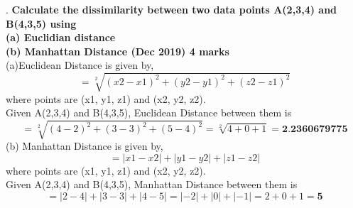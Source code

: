 .
\textbf{\textcolor{LightMagenta}{Calculate the dissimilarity between two data points A(2,3,4) and B(4,3,5) using\\ 
(a) Euclidian distance\\ (b) Manhattan Distance  (Dec 2019) \hfill 4 marks}} \\[5pt]
(a)Euclidean Distance is given by,\[=\sqrt[2]{(x2-x1)^2+(y2-y1)^2+(z2-z1)^2}\] 
where points are (x1, y1, z1) and (x2, y2, z2).\\
Given A(2,3,4) and B(4,3,5), Euclidean Distance between them is \[=\sqrt[2]{(4-2)^2+(3-3)^2+(5-4)^2} = \sqrt[2]{4+0+1}= \textbf{2.2360679775}\]
(b) Manhattan Distance is given by, \[=|x1 - x2| + |y1 - y2| + |z1 - z2|\]
where points are (x1, y1, z1) and (x2, y2, z2).\\
Given A(2,3,4) and B(4,3,5), Manhattan Distance between them is
\[=|2 - 4| + |3 - 3| + |4 - 5|=|-2| + |0| + |-1|=2 + 0 + 1=\textbf{5}\] 
